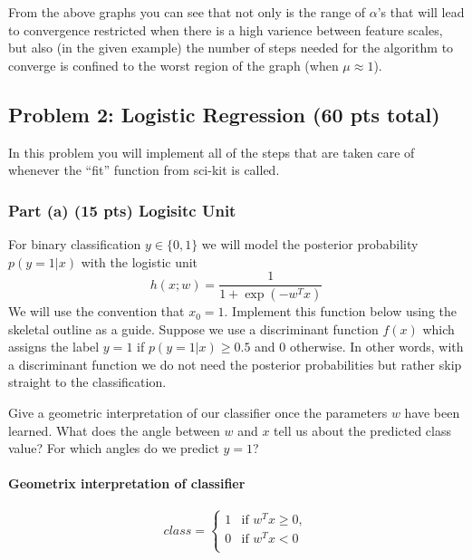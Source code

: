 \documentclass[11pt]{article}
\begin{document}
    From the above graphs you can see that not only is the range of
\(\alpha\)'s that will lead to convergence restricted when there is a
high varience between feature scales, but also (in the given example)
the number of steps needed for the algorithm to converge is confined to
the worst region of the graph (when \(\mu \approx 1\)).

    \hypertarget{problem-2-logistic-regression-60-pts-total}{%
\subsection{Problem 2: Logistic Regression (60 pts
total)}\label{problem-2-logistic-regression-60-pts-total}}

In this problem you will implement all of the steps that are taken care
of whenever the ``fit'' function from sci-kit is called.

    \hypertarget{part-a-15-pts-logisitc-unit}{%
\subsubsection{Part (a) (15 pts) Logisitc
Unit}\label{part-a-15-pts-logisitc-unit}}

For binary classification \(y \in \{0,1\}\) we will model the posterior
probability \(p(y = 1 | x)\) with the logistic unit \[
h(x; w) = \frac{1}{1 + \exp(-w^Tx)}
\] We will use the convention that \(x_0 = 1\). Implement this function
below using the skeletal outline as a guide. Suppose we use a
discriminant function \(f(x)\) which assigns the label \(y = 1\) if
\(p(y = 1 | x) \ge 0.5\) and \(0\) otherwise. In other words, with a
discriminant function we do not need the posterior probabilities but
rather skip straight to the classification.

Give a geometric interpretation of our classifier once the parameters
\(w\) have been learned. What does the angle between \(w\) and \(x\)
tell us about the predicted class value? For which angles do we predict
\(y=1\)?

    \hypertarget{geometrix-interpretation-of-classifier}{%
\paragraph{Geometrix interpretation of
classifier}\label{geometrix-interpretation-of-classifier}}

    \[
   class = 
\begin{cases}
    1       &   \text{if } w^Tx \geq 0, \\
    0       &   \text{if }  w^Tx < 0    \\
\end{cases}
\]
\end{document}
